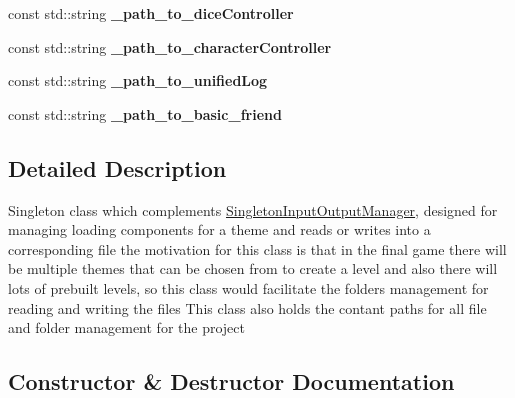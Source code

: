 \begin{DoxyCompactItemize}
const std\+::string {\bfseries \+\_\+path\+\_\+to\+\_\+dice\+Controller}
\item 
\hypertarget{class_singleton_file_path_and_folder_manager_a0f506b25a9aa6c706773ccf9dd8d52de}{}\label{class_singleton_file_path_and_folder_manager_a0f506b25a9aa6c706773ccf9dd8d52de} 
const std\+::string {\bfseries \+\_\+path\+\_\+to\+\_\+character\+Controller}
\item 
\hypertarget{class_singleton_file_path_and_folder_manager_a66e0f01849958a99b4a66494a4e01677}{}\label{class_singleton_file_path_and_folder_manager_a66e0f01849958a99b4a66494a4e01677} 
const std\+::string {\bfseries \+\_\+path\+\_\+to\+\_\+unified\+Log}
\item 
\hypertarget{class_singleton_file_path_and_folder_manager_a7dc72c5de1bfb893034f9e3e7fa08857}{}\label{class_singleton_file_path_and_folder_manager_a7dc72c5de1bfb893034f9e3e7fa08857} 
const std\+::string {\bfseries \+\_\+path\+\_\+to\+\_\+basic\+\_\+friend}
\end{DoxyCompactItemize}


\subsection{Detailed Description}
Singleton class which complements \hyperlink{class_singleton_input_output_manager}{Singleton\+Input\+Output\+Manager}, designed for managing loading components for a theme and reads or writes into a corresponding file the motivation for this class is that in the final game there will be multiple themes that can be chosen from to create a level and also there will lots of prebuilt levels, so this class would facilitate the folders management for reading and writing the files This class also holds the contant paths for all file and folder management for the project 

\subsection{Constructor \& Destructor Documentation}
\hypertarget{class_singleton_file_path_and_folder_manager_a598800592aee8d9e19465261714c2f28}{}\label{class_singleton_file_path_and_folder_manager_a598800592aee8d9e19465261714c2f28} 
